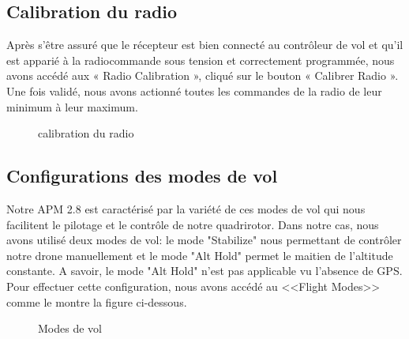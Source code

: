 \documentclass[a4paper,12pt]{book}
\begin{document}
\subsection{Calibration du radio}
Après s’être assuré que le récepteur est bien connecté au contrôleur de vol et qu’il est apparié à la
radiocommande sous tension et correctement programmée, nous avons  accédé aux « Radio
Calibration », cliqué sur le bouton « Calibrer Radio ». 
Une fois validé, nous avons actionné toutes les commandes de la radio de leur minimum à leur maximum. 
\begin{figure} [h]
	\begin{center}
		\centering
	\end{center}
	\caption{calibration du radio}
\end{figure}

\subsection{Configurations des modes de vol} 
Notre APM 2.8 est caractérisé par la variété de ces modes de vol qui nous facilitent le pilotage et le contrôle de notre quadrirotor. Dans notre cas, nous avons utilisé deux modes de vol: le mode "Stabilize" nous permettant de contrôler notre drone manuellement et le mode "Alt Hold" permet le maitien de l'altitude constante. A savoir, le mode "Alt Hold" n'est pas applicable vu l'absence de GPS. Pour effectuer  cette configuration, nous avons accédé au <<Flight Modes>> comme le montre la figure ci-dessous.

\begin{figure} [h]
	\begin{center}
		\centering
	\end{center}
	\caption{Modes de vol}
\end{figure}
\newpage
\end{document}

